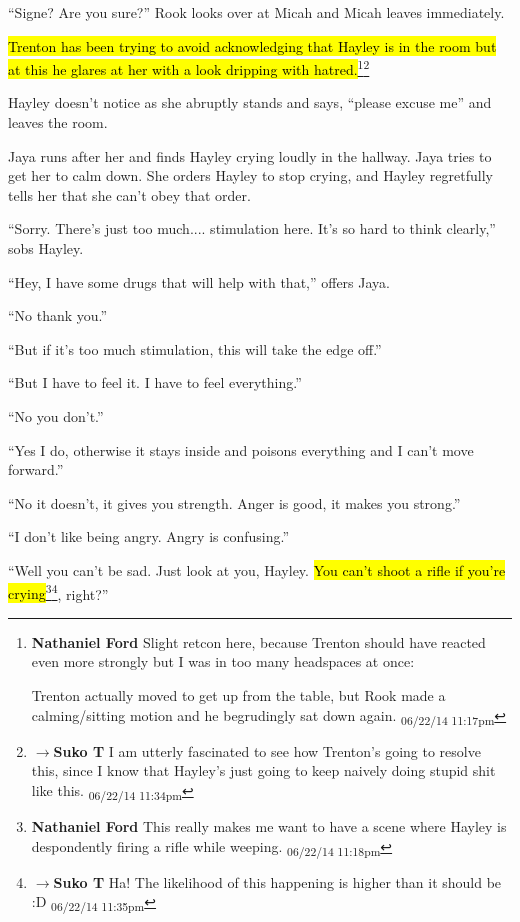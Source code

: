 ``Signe?  Are you sure?'' Rook looks over at Micah and Micah leaves immediately.

\hl{Trenton has been trying to avoid acknowledging that Hayley is in the room but at this he glares at her with a look dripping with hatred.}\footnote{\textbf{Nathaniel Ford }Slight retcon here, because Trenton should have reacted even more strongly but I was in too many headspaces at once:

Trenton actually moved to get up from the table, but Rook made a calming/sitting motion and he begrudingly sat down again. \textsubscript{06/22/14 11:17pm}}\footnote{$\rightarrow$\textbf{Suko T }I am utterly fascinated to see how Trenton's going to resolve this, since I know that Hayley's just going to keep naively doing stupid shit like this. \textsubscript{06/22/14 11:34pm}}  

Hayley doesn't notice as she abruptly stands and says, ``please excuse me'' and leaves the room.



Jaya runs after her and finds Hayley crying loudly in the hallway.  Jaya tries to get her to calm down.  She orders Hayley to stop crying, and Hayley regretfully tells her that she can't obey that order.

``Sorry.  There's just too much.... stimulation here. It's so hard to think clearly,'' sobs Hayley.

``Hey, I have some drugs that will help with that,'' offers Jaya.

``No thank you.''

``But if it's too much stimulation, this will take the edge off.''

``But I have to feel it.  I have to feel everything.''

``No you don't.''

``Yes I do, otherwise it stays inside and poisons everything and I can't move forward.''

``No it doesn't, it gives you strength.  Anger is good, it makes you strong.''

``I don't like being angry.  Angry is confusing.''

``Well you can't be sad.  Just look at you, Hayley.  \hl{You can't shoot a rifle if you're crying}\footnote{\textbf{Nathaniel Ford }This really makes me want to have a scene where Hayley is despondently firing a rifle while weeping. \textsubscript{06/22/14 11:18pm}}\footnote{$\rightarrow$\textbf{Suko T }Ha!  The likelihood of this happening is higher than it should be :D \textsubscript{06/22/14 11:35pm}}, right?''

